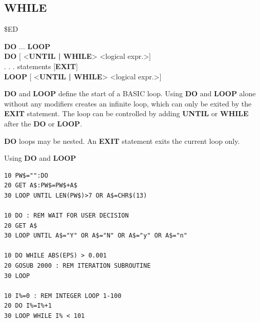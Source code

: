 \subsection{WHILE}
\begin{description}[leftmargin=2cm,style=nextline]
\item [Token:] \$ED
\item [Format:] {\bf DO} ... {\bf LOOP} \\
                {\bf DO} [ <{\bf UNTIL | WHILE}> <logical expr.>] \\
                . . . statements [{\bf EXIT}] \\
                {\bf LOOP} [ <{\bf UNTIL | WHILE}> <logical expr.>]
\item [Usage:] {\bf DO} and {\bf LOOP} define
                the start of a BASIC loop.
                Using {\bf DO} and {\bf LOOP} alone without any
                modifiers creates an infinite loop, which can only be exited
                by the {\bf EXIT} statement. The loop can be
                controlled by adding {\bf UNTIL} or {\bf WHILE}
                after the {\bf DO} or {\bf LOOP}.

\item [Remarks:] {\bf DO} loops may be nested. An {\bf EXIT} statement
               exits the current loop only.
\item [Examples:] Using {\bf DO} and {\bf LOOP}
\begin{tcolorbox}[colback=black,coltext=white]
\verbatimfont{\codefont}
\begin{verbatim}
10 PW$="":DO
20 GET A$:PW$=PW$+A$
30 LOOP UNTIL LEN(PW$)>7 OR A$=CHR$(13)

10 DO : REM WAIT FOR USER DECISION
20 GET A$
30 LOOP UNTIL A$="Y" OR A$="N" OR A$="y" OR A$="n"

10 DO WHILE ABS(EPS) > 0.001
20 GOSUB 2000 : REM ITERATION SUBROUTINE
30 LOOP

10 I%=0 : REM INTEGER LOOP 1-100
20 DO I%=I%+1
30 LOOP WHILE I% < 101
\end{verbatim}
\end{tcolorbox}
\end{description}


\newpage
